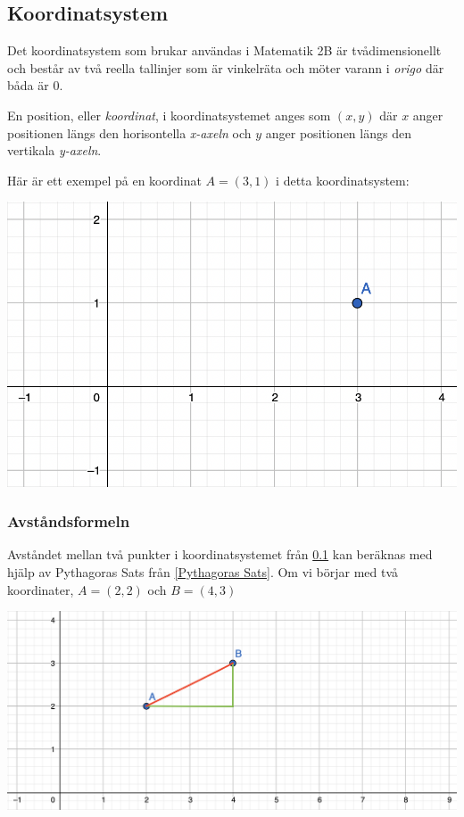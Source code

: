 \subsection{Koordinatsystem}
\label{Koordinatsystem}

Det koordinatsystem som brukar användas i Matematik 2B är tvådimensionellt och består av två reella tallinjer som är vinkelräta och möter varann i \textit{origo} där båda är $0$.

En position, eller \textit{koordinat}, i koordinatsystemet anges som $(x, y)$ där $x$ anger positionen längs den horisontella \textit{x-axeln} och $y$ anger positionen längs den vertikala \textit{y-axeln}.

Här är ett exempel på en koordinat $A = (3, 1)$ i detta koordinatsystem:

\includegraphics[width=\textwidth]{img/1.png}

\newpage
\subsubsection{Avståndsformeln}

Avståndet mellan två punkter i koordinatsystemet från \ref{Koordinatsystem} kan beräknas med hjälp av Pythagoras Sats från \ref{Pythagoras Sats}. Om vi börjar med två koordinater, $A=(2,2)$ och $B=(4,3)$

\includegraphics[width=\textwidth]{img/3.png}


